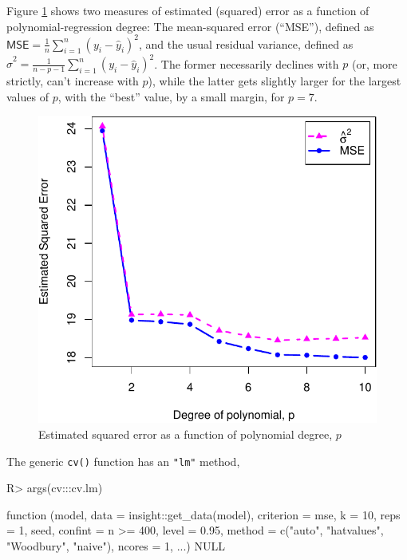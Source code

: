\documentclass[
]{jss}
\begin{document}
Figure \ref{fig:mpg-horsepower-MSE-se} shows two measures of estimated
(squared) error as a function of polynomial-regression degree: The
mean-squared error (``MSE''), defined as
\(\mathsf{MSE} = \frac{1}{n}\sum_{i=1}^n (y_i - \widehat{y}_i)^2\), and
the usual residual variance, defined as
\(\widehat{\sigma}^2 = \frac{1}{n - p - 1} \sum_{i=1}^n (y_i - \widehat{y}_i)^2\).
The former necessarily declines with \(p\) (or, more strictly, can't
increase with \(p\)), while the latter gets slightly larger for the
largest values of \(p\), with the ``best'' value, by a small margin, for
\(p = 7\).

\begin{CodeChunk}
\begin{figure}

{\centering \includegraphics[width=0.5\linewidth]{JSS-article-reduced_files/figure-latex/mpg-horsepower-MSE-se-1} 

}

\caption[Estimated squared error as a function of polynomial degree, $p$]{Estimated squared error as a function of polynomial degree, $p$}\label{fig:mpg-horsepower-MSE-se}
\end{figure}
\end{CodeChunk}

The generic \texttt{cv()} function has an \texttt{"lm"} method,

\begin{CodeChunk}
\begin{CodeInput}
R> args(cv:::cv.lm)
\end{CodeInput}
\begin{CodeOutput}
function (model, data = insight::get_data(model), criterion = mse, 
    k = 10, reps = 1, seed, confint = n >= 400, level = 0.95, 
    method = c("auto", "hatvalues", "Woodbury", "naive"), ncores = 1, 
    ...) 
NULL
\end{CodeOutput}
\end{CodeChunk}
\end{document}
